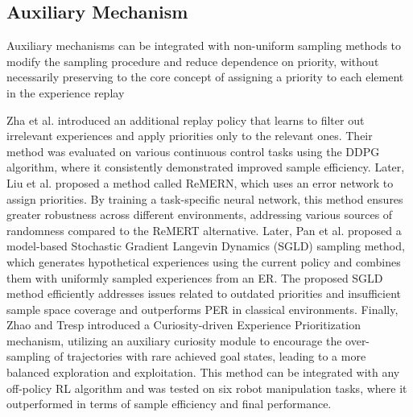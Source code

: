 


\subsection{Auxiliary Mechanism}

Auxiliary mechanisms can be integrated with non-uniform sampling methods to modify the sampling procedure and reduce dependence on priority, without necessarily preserving to the core concept of assigning a priority to each element in the experience replay

Zha et al. \cite{zha2019experience} introduced an additional replay policy that learns to filter out irrelevant experiences and apply priorities only to the relevant ones. Their method was evaluated on various continuous control tasks using the DDPG algorithm, where it consistently demonstrated improved sample efficiency. Later, Liu et al. \cite{liu2021regret} proposed a method called ReMERN, which uses an error network to assign priorities. By training a task-specific neural network, this method ensures greater robustness across different environments, addressing various sources of randomness compared to the ReMERT alternative. Later, Pan et al. \cite{pan2022understanding} proposed a model-based Stochastic Gradient Langevin Dynamics (SGLD) sampling method, which generates hypothetical experiences using the current policy and combines them with uniformly sampled experiences from an ER. The proposed SGLD method efficiently addresses issues related to outdated priorities and insufficient sample space coverage and outperforms PER in classical environments. Finally, Zhao and Tresp \cite{zhao2019curiosity} introduced a Curiosity-driven Experience Prioritization mechanism, utilizing an auxiliary curiosity module to encourage the over-sampling of trajectories with rare achieved goal states, leading to a more balanced exploration and exploitation. This method can be integrated with any off-policy RL algorithm and was tested on six robot manipulation tasks, where it outperformed in terms of sample efficiency and final performance.

